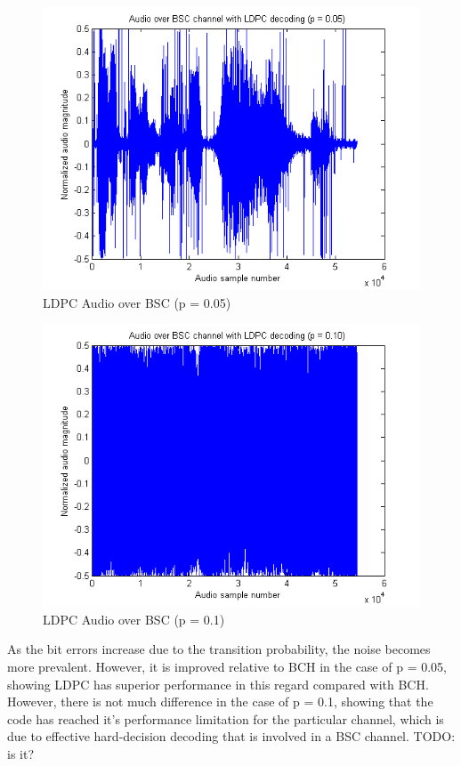 \documentclass[a4paper]{article}
\begin{document}
\begin{figure}[H]
\centering
\includegraphics[scale=0.5]{plots/audio_over_bsc_ldpc_p_005.png}
\caption{LDPC Audio over BSC (p = 0.05)}
\end{figure}

\begin{figure}[H]
\centering
\includegraphics[scale=0.5]{plots/audio_over_bsc_ldpc_p_010.png}
\caption{LDPC Audio over BSC (p = 0.1)}
\end{figure}

As the bit errors increase due to the transition probability, the noise becomes more prevalent. However, it is improved relative to BCH in the case of p = 0.05, showing LDPC has superior performance in this regard compared with BCH. However, there is not much difference in the case of p = 0.1, showing that the code has reached it's performance limitation for the particular channel, which is due to effective hard-decision decoding that is involved in a BSC channel. TODO: is it?
\end{document}
